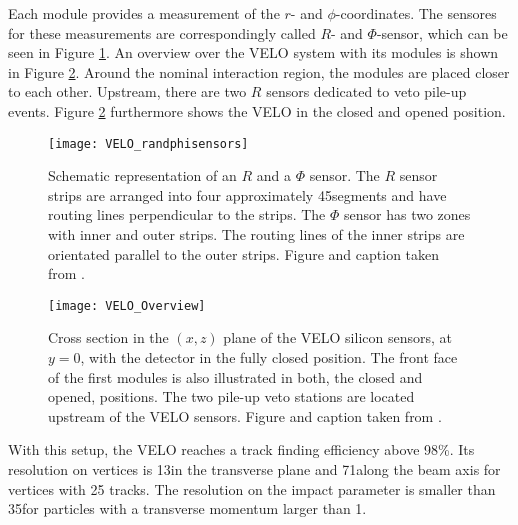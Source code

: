 Each module provides a measurement of the $r$- and $\phi$-coordinates.
The sensores for these measurements are correspondingly called $R$- and $\Phi$-sensor, which can be seen in Figure \ref{fig:VELO_RandPhiSensor}.
An overview over the VELO system with its modules is shown in Figure \ref{fig:VELO_Overview}. 
Around the nominal interaction region, the modules are placed closer to each other. 
Upstream, there are two $R$ sensors dedicated to veto pile-up events. 
Figure \ref{fig:VELO_Overview} furthermore shows the VELO in the closed and opened position.
\begin{figure}[tbp]
    \centering
	\texttt{[image: VELO\_randphisensors]}	
	\caption{Schematic representation of an $R$ and a $\Phi$ sensor. The $R$ sensor strips are arranged into four approximately 45\degrees segments and have routing lines perpendicular to the strips. The $\Phi$ sensor has two zones with inner and outer strips. The routing lines of the inner strips
    are orientated parallel to the outer strips. Figure and caption taken from \cite{VELO_Performance}.}
	\label{fig:VELO_RandPhiSensor}
\end{figure}
\begin{figure}[tbp]
    \centering
	\texttt{[image: VELO\_Overview]}	
	\caption{Cross section in the $(x,z)$ plane of the VELO silicon sensors, at $y=0$, with the detector in the fully closed position. 
             The front face of the first modules is also illustrated in both, the closed and opened, positions. 
             The two pile-up veto stations are located upstream of the VELO sensors.
             Figure and caption taken from \cite{detector}.}
	\label{fig:VELO_Overview}
\end{figure}

With this setup, the VELO reaches a track finding efficiency above 98\%. 
Its resolution on vertices is 13\mum in the transverse plane and 71\mum along the beam axis for vertices with 25 tracks. 
The resolution on the impact parameter is smaller than 35\mum for particles with a transverse momentum larger than 1\gev \cite{detector, VELO_TDR, VELO_Performance}.

